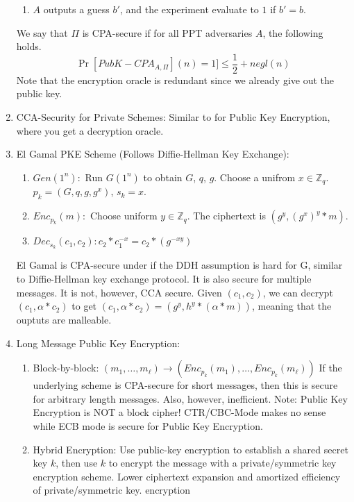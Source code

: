 \documentclass[12pt,letterpaper]{article}
\begin{document}
\begin{enumerate}
\begin{enumerate}
   			\item $A$ outputs a guess $b'$, and the experiment evaluate to $1$ if $b'=b$.
   		\end{enumerate}
   		We say that $\Pi$ is CPA-secure if for all PPT adversaries $A$, the following holds.
   			\[\Pr[PubK-CPA_{A,\Pi}](n)=1]\leq\frac{1}{2}+negl(n)\]
   			Note that the encryption oracle is redundant since we already give out the public key.\newpage
   		\item CCA-Security for Private Schemes: Similar to for Public Key Encryption, where you get a decryption oracle.
   		\item El Gamal PKE Scheme (Follows Diffie-Hellman Key Exchange):
   		\begin{enumerate}
   			\item $Gen(1^n):$ Run $G(1^n)$ to obtain $G$, $q$, $g$. Choose a unifrom $x\in\mathbb{Z}_q$. $p_k=(G,q,g,g^x)$, $s_k=x$.
   			\item $Enc_{p_k}(m):$ Choose uniform $y\in\mathbb{Z}_q$. The ciphertext is $(g^y,(g^x)^y*m)$.
   			\item $Dec_{s_k}(c_1,c_2): c_2*c_1^{-x}=c_2*(g^{-xy})$ 
   		\end{enumerate}
   		El Gamal is CPA-secure under if the DDH assumption is hard for G, similar to Diffie-Hellman key exchange protocol. It is also secure for multiple messages.\bigskip\newline
   		It is not, however, CCA secure. Given $(c_1,c_2)$, we can decrypt $(c_1,\alpha*c_2)$ to get $(c_1,\alpha*c_2)=(g^y,h^y*(\alpha*m))$, meaning that the ouptuts are malleable.
   		\item 
   			Long Message Public Key Encryption: 
   		\begin{enumerate}
   				\item Block-by-block: $(m_1,\ldots,m_\ell)\rightarrow(Enc_{p_k}(m_1),\ldots,Enc_{p_k}(m_\ell))$\smallskip\newline
   				If the underlying scheme is CPA-secure for short messages, then this is secure for arbitrary length messages. Also, however, inefficient.\smallskip\newline
   				Note: Public Key Encryption is NOT a block cipher! CTR/CBC-Mode makes no sense while ECB mode is secure for Public Key Encryption.\newpage
   				\item Hybrid Encryption: Use public-key encryption to establish a shared secret key $k$, then use $k$ to encrypt the message with a private/symmetric key encryption scheme. Lower ciphertext expansion and amortized efficiency of private/symmetric key. encryption\smallskip\newline

\end{enumerate}
\end{enumerate}
\end{document}
